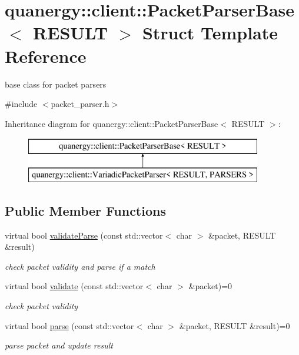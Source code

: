 \hypertarget{structquanergy_1_1client_1_1PacketParserBase}{\section{quanergy\-:\-:client\-:\-:Packet\-Parser\-Base$<$ R\-E\-S\-U\-L\-T $>$ Struct Template Reference}
\label{structquanergy_1_1client_1_1PacketParserBase}
}


base class for packet parsers  




{\ttfamily \#include $<$packet\-\_\-parser.\-h$>$}

Inheritance diagram for quanergy\-:\-:client\-:\-:Packet\-Parser\-Base$<$ R\-E\-S\-U\-L\-T $>$\-:\begin{figure}[H]
\begin{center}
\leavevmode
\includegraphics[height=2.000000cm]{structquanergy_1_1client_1_1PacketParserBase}
\end{center}
\end{figure}
\subsection*{Public Member Functions}
\begin{DoxyCompactItemize}
\item 
virtual bool \hyperlink{structquanergy_1_1client_1_1PacketParserBase_ace6f4bff879bd05ec7dbc670802f70c9}{validate\-Parse} (const std\-::vector$<$ char $>$ \&packet, R\-E\-S\-U\-L\-T \&result)
\begin{DoxyCompactList}\small\item\em check packet validity and parse if a match \end{DoxyCompactList}\item 
virtual bool \hyperlink{structquanergy_1_1client_1_1PacketParserBase_ad840fd4e7f3ab054024957ae1d94ffa1}{validate} (const std\-::vector$<$ char $>$ \&packet)=0
\begin{DoxyCompactList}\small\item\em check packet validity \end{DoxyCompactList}\item 
virtual bool \hyperlink{structquanergy_1_1client_1_1PacketParserBase_a4a0555355f550738007edf7994da1c8c}{parse} (const std\-::vector$<$ char $>$ \&packet, R\-E\-S\-U\-L\-T \&result)=0
\begin{DoxyCompactList}\small\item\em parse packet and update result \end{DoxyCompactList}\end{DoxyCompactItemize}


